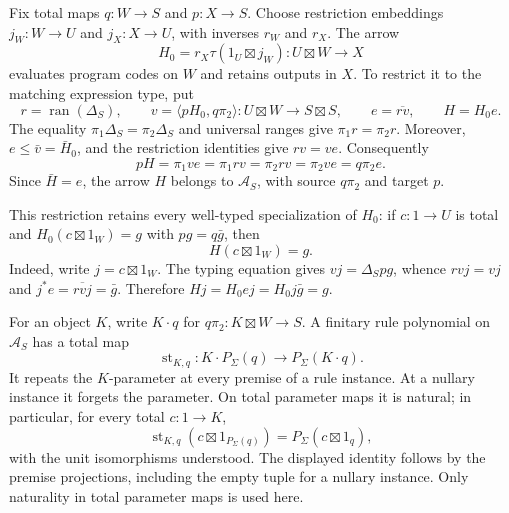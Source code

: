 \documentclass[11pt]{article}
\theoremstyle{definition}
\theoremstyle{remark}
\newcommand{\ran}{\operatorname{ran}}
\begin{document}
Fix total maps $q:W\to S$ and $p:X\to S$. Choose restriction
embeddings $j_W:W\to U$ and $j_X:X\to U$, with inverses
$r_W$ and $r_X$. The arrow
\[
 H_0=r_X\tau(1_U\boxtimes j_W):U\boxtimes W\longrightarrow X
\]
evaluates program codes on $W$ and retains outputs in $X$. To restrict
it to the matching expression type, put
\[
 r=\ran(\Delta_S),\qquad
 v=\langle pH_0,q\pi_2\rangle:U\boxtimes W\to S\boxtimes S,
 \qquad e=\overline{rv},\qquad H=H_0e.
\]
The equality $\pi_1\Delta_S=\pi_2\Delta_S$ and universal ranges give
$\pi_1r=\pi_2r$. Moreover, $e\le\bar v=\bar H_0$, and the restriction
identities give $rv=ve$. Consequently
\[
 pH=\pi_1ve=\pi_1rv=\pi_2rv=\pi_2ve=q\pi_2e.
\]
Since $\bar H=e$, the arrow $H$ belongs to $\mathscr A_S$, with source
$q\pi_2$ and target $p$.

This restriction retains every well-typed specialization of $H_0$:
if $c:1\to U$ is total and $H_0(c\boxtimes1_W)=g$ with
$pg=q\bar g$, then
\begin{equation}\label{gen:type-filter}
 H(c\boxtimes1_W)=g.
\end{equation}
Indeed, write $j=c\boxtimes1_W$. The typing equation gives
$vj=\Delta_Spg$, whence $rvj=vj$ and
$j^*e=\overline{rvj}=\bar g$. Therefore
$Hj=H_0ej=H_0j\bar g=g$.

For an object $K$, write $K\cdot q$ for
$q\pi_2:K\boxtimes W\to S$. A finitary rule polynomial on
$\mathscr A_S$ has a total map
\[
 \operatorname{st}_{K,q}:K\cdot P_\Sigma(q)
                  \longrightarrow P_\Sigma(K\cdot q).
\]
It repeats the $K$-parameter at every premise of a rule instance.
At a nullary instance it forgets the parameter. On total parameter
maps it is natural; in particular, for every total $c:1\to K$,
\begin{equation}\label{gen:total-parameter-strength}
 \operatorname{st}_{K,q}(c\boxtimes1_{P_\Sigma(q)})
   =P_\Sigma(c\boxtimes1_q),
\end{equation}
with the unit isomorphisms understood. The displayed identity follows
by the premise projections, including the empty tuple for a nullary
instance. Only naturality in total parameter maps is used here.
\end{document}
